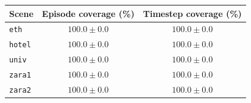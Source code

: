 \begin{tabular}{lcc}
\hline
Scene & Episode coverage (\%) & Timestep coverage (\%) \\
\hline
\texttt{eth} & $100.0\pm0.0$ & $100.0\pm0.0$ \\
\texttt{hotel} & $100.0\pm0.0$ & $100.0\pm0.0$ \\
\texttt{univ} & $100.0\pm0.0$ & $100.0\pm0.0$ \\
\texttt{zara1} & $100.0\pm0.0$ & $100.0\pm0.0$ \\
\texttt{zara2} & $100.0\pm0.0$ & $100.0\pm0.0$ \\
\hline
\end{tabular}
